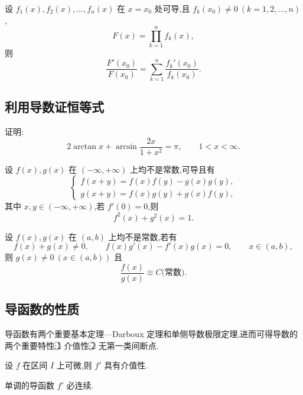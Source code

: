\documentclass[../../数学分析培优讲义.tex]{subfiles}
\begin{document}
\begin{example}
设 $f_1(x),f_2(x),\ldots,f_n(x)$ 在 $x=x_0$ 处可导,且 $f_k(x_0)\neq0\ (k=1,2,\ldots,n)$,
\[
    F(x)=\prod\limits_{k=1}^n f_k(x),
\]
则
\[
    \dfrac{F'(x_0)}{F(x_0)}
    =\sum\limits_{k=1}^n\dfrac{f_k'(x_0)}{f_k(x_0)}.
\]
\end{example}
\exampleblank



\subsection{利用导数证恒等式}

\begin{example}
证明:
\[
    2\arctan x+\arcsin\dfrac{2x}{1+x^2}=\pi,
    \qquad 1<x<\infty.
\]
\end{example}
\exampleblank

\begin{example}
设 $f(x),g(x)$ 在 $(-\infty,+\infty)$ 上均不是常数,可导且有
\[
\begin{cases}
    f(x+y)=f(x)f(y)-g(x)g(y),\\
    g(x+y)=f(x)g(y)+g(x)f(y),
\end{cases}
\]
其中 $x,y\in(-\infty,+\infty)$,若 $f'(0)=0$,则
\[
    f^2(x)+g^2(x)=1.
\]
\end{example}
\exampleblank

\begin{example}
设 $f(x),g(x)$ 在 $(a,b)$ 上均不是常数,若有
\[
    f(x)+g(x)\neq0,
    \qquad
    f(x)g'(x)-f'(x)g(x)=0,
    \qquad x\in(a,b),
\]
则 $g(x)\neq0\ (x\in(a,b))$ 且
\[
    \dfrac{f(x)}{g(x)}\equiv C\text{(常数)}.
\]
\end{example}
\exampleblank



\subsection{导函数的性质}

导函数有两个重要基本定理---Darboux 定理和单侧导数极限定理,进而可得导数的两个重要特性:\textcircled{1} 介值性;\textcircled{2} 无第一类间断点.

\begin{theorem}
设 $f$ 在区间 $I$ 上可微,则 $f'$ 具有介值性.
\end{theorem}

\begin{corollary}[\markstar]
单调的导函数 $f'$ 必连续.
\end{corollary}
\end{document}

